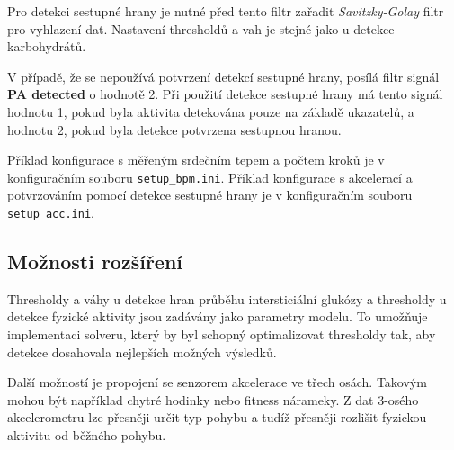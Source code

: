 Pro detekci sestupné hrany je nutné před tento filtr zařadit \textit{Savitzky-Golay} filtr pro vyhlazení dat. Nastavení thresholdů a vah je stejné jako u detekce karbohydrátů.

V případě, že se nepoužívá potvrzení detekcí sestupné hrany, posílá filtr signál \textbf{PA detected} o hodnotě 2. Při použití detekce sestupné hrany má tento signál hodnotu 1, pokud byla aktivita detekována pouze na základě ukazatelů, a hodnotu 2, pokud byla detekce potvrzena sestupnou hranou.

Příklad konfigurace s měřeným srdečním tepem a počtem kroků je v konfiguračním souboru \texttt{setup\_bpm.ini}. Příklad konfigurace s akcelerací a potvrzováním pomocí detekce sestupné hrany je v konfiguračním souboru \texttt{setup\_acc.ini}.

\subsection{Možnosti rozšíření}

Thresholdy a váhy u detekce hran průběhu intersticiální glukózy a thresholdy u detekce fyzické aktivity jsou zadávány jako parametry modelu. To umožňuje implementaci solveru, který by byl schopný optimalizovat thresholdy tak, aby detekce dosahovala nejlepších možných výsledků.

Další možností je propojení se senzorem akcelerace ve třech osách. Takovým mohou být například chytré hodinky nebo fitness nárameky. Z dat 3-osého akcelerometru lze přesněji určit typ pohybu a tudíž přesněji rozlišit fyzickou aktivitu od běžného pohybu.